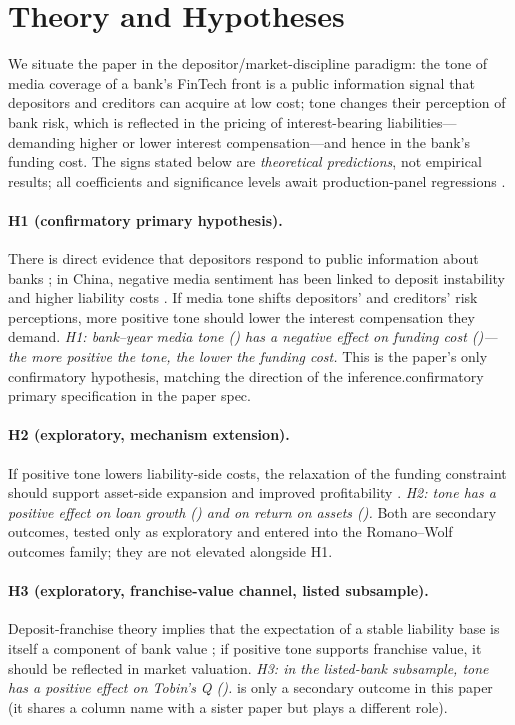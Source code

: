 \section{Theory and Hypotheses}\label{sec:hypo}

We situate the paper in the depositor/market-discipline paradigm: the
tone of media coverage of a bank's FinTech front is a public
information signal that depositors and creditors can acquire at low
cost; tone changes their perception of bank risk, which is reflected in
the pricing of interest-bearing liabilities---demanding higher or lower
interest compensation---and hence in the bank's funding cost. The
signs stated below are \emph{theoretical predictions}, not empirical
results; all coefficients and significance levels await
production-panel regressions .

\paragraph{H1 (confirmatory primary hypothesis).}
There is direct evidence that depositors respond to public information
about banks \parencite{chen2022transparency}; in China, negative media
sentiment has been linked to deposit instability and higher liability
costs \parencite{fang2024mediadeposit}. If media tone shifts
depositors' and creditors' risk perceptions, more positive tone should
lower the interest compensation they demand.
\emph{H1: bank--year media tone () has a
negative effect on funding cost ()---the more
positive the tone, the lower the funding cost.} This is the paper's
only confirmatory hypothesis, matching the direction of the
inference.confirmatory primary specification in the paper spec.

\paragraph{H2 (exploratory, mechanism extension).}
If positive tone lowers liability-side costs, the relaxation of the
funding constraint should support asset-side expansion and improved
profitability \parencite{goldstein2023information}.
\emph{H2: tone has a positive effect on loan growth
() and on return on assets ().} Both are
secondary outcomes, tested only as exploratory and entered into the
Romano--Wolf outcomes family; they are not elevated alongside H1.

\paragraph{H3 (exploratory, franchise-value channel, listed
subsample).}
Deposit-franchise theory implies that the expectation of a stable
liability base is itself a component of bank value
\parencite{drechsler2026franchise}; if positive tone supports franchise
value, it should be reflected in market valuation. \emph{H3: in the
listed-bank subsample, tone has a positive effect on Tobin's Q
().}  is only a secondary outcome in
this paper (it shares a column name with a sister paper but plays a
different role).

